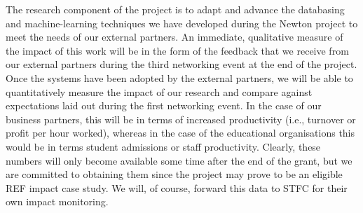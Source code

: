 \documentclass[11pt]{article}
\begin{document}
  \vspace{2mm}
  \noindent
  The research component of the project is to adapt and advance the databasing and machine-learning techniques we have developed during the Newton project to meet the needs of our external partners. An immediate, qualitative measure of the impact of this work will be in the form of the feedback that we receive from our external partners during the third networking event at the end of the project. Once the systems have been adopted by the external partners, we will be able to quantitatively measure the impact of our research and compare against expectations laid out during the first networking event. In the case of our business partners, this will be in terms of increased productivity (i.e., turnover or profit per hour worked), whereas in the case of the educational organisations this would be in terms student admissions or staff productivity. Clearly, these numbers will only become available some time after the end of the grant, but we are committed to obtaining them since the project may prove to be an eligible REF impact case study. We will, of course, forward this data to STFC for their own impact monitoring.
  
  
\end{document}
